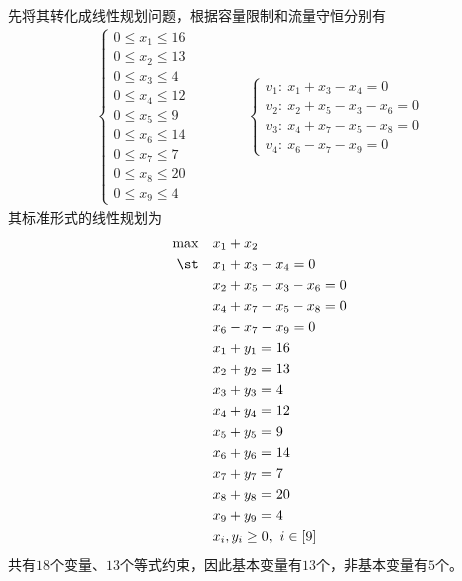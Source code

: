 \documentclass{ctexart}
\begin{document}
先将其转化成线性规划问题，根据容量限制和流量守恒分别有
\begin{align*}
    \begin{cases}
        0 \le x_1 \le 16 \\
        0 \le x_2 \le 13 \\
        0 \le x_3 \le 4  \\
        0 \le x_4 \le 12 \\
        0 \le x_5 \le 9  \\
        0 \le x_6 \le 14 \\
        0 \le x_7 \le 7  \\
        0 \le x_8 \le 20 \\
        0 \le x_9 \le 4
    \end{cases} \qquad \qquad
    \begin{cases}
        v_1: ~ x_1 + x_3 - x_4 = 0       \\
        v_2: ~ x_2 + x_5 - x_3 - x_6 = 0 \\
        v_3: ~ x_4 + x_7 - x_5 - x_8 = 0 \\
        v_4: ~ x_6 - x_7 - x_9 = 0
    \end{cases}
\end{align*}
其标准形式的线性规划为
\begin{align*}
    \max \quad & x_1 + x_2                   \\
    \st \quad  & x_1 + x_3 - x_4 = 0         \\
               & x_2 + x_5 - x_3 - x_6 = 0   \\
               & x_4 + x_7 - x_5 - x_8 = 0   \\
               & x_6 - x_7 - x_9 = 0         \\
               & x_1 + y_1 = 16              \\
               & x_2 + y_2 = 13              \\
               & x_3 + y_3 = 4               \\
               & x_4 + y_4 = 12              \\
               & x_5 + y_5 = 9               \\
               & x_6 + y_6 = 14              \\
               & x_7 + y_7 = 7               \\
               & x_8 + y_8 = 20              \\
               & x_9 + y_9 = 4               \\
               & x_i, y_i \ge 0, ~ i \in [9]
\end{align*}
共有$18$个变量、$13$个等式约束，因此基本变量有$13$个，非基本变量有$5$个。
\end{document}
